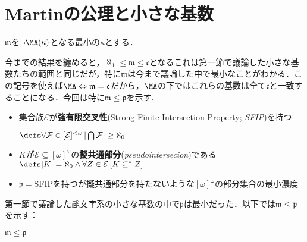 \documentclass[a4j]{bxjsarticle}
\theoremstyle{definition}
\begin{document}
\section{Martinの公理と小さな基数}
\begin{definition}
 $\mathfrak{m}$を$\neg \MA(\kappa)$となる最小の$\kappa$とする．
\end{definition}
今までの結果を纏めると，$\aleph_1 \leq \mathfrak{m} \leq \mathfrak{c}$となるこれは第一節で議論した小さな基数たちの範囲と同じだが，特に$\mathfrak{m}$は今まで議論した中で最小なことがわかる．この記号を使えば$\MA \Leftrightarrow \mathfrak{m} = \mathfrak{c}$だから，$\MA$の下ではこれらの基数は全て$\mathfrak{c}$と一致することになる．今回は特に$\mathfrak{m} \leq \mathfrak{p}$を示す．

\begin{definition}
 \begin{itemize}
  \item 集合族$\mathcal{E}$が\textbf{強有限交叉性}(Strong Finite Intersection Property; \textit{SFIP})を持つ

	$\defs \forall \mathcal{F} \in [\mathcal{E}]^{<\omega} \, |\bigcap \mathcal{F}| \geq \aleph_0$
  \item $K$が$\mathcal{E} \subseteq [\omega]^\omega$の\textbf{擬共通部分}(\textit{pseudointersecion})である
	$\defs |K| = \aleph_0 \wedge \forall Z \in \mathcal{E} \,[ K \mathrel{\mathord{\subseteq}^*} Z]$
  \item $\mathfrak{p} = $SFIPを持つが擬共通部分を持たないような$[\omega]^\omega$の部分集合の最小濃度
 \end{itemize}
\end{definition}
第一節で議論した髭文字系の小さな基数の中で$\mathfrak{p}$は最小だった．以下では$\mathfrak{m} \leq \mathfrak{p}$を示す：
\begin{lemma}\label{lem:p}
 $\mathfrak{m} \leq \mathfrak{p}$
\end{lemma}
\end{document}
